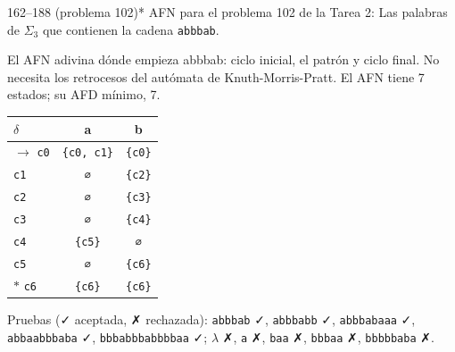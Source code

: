 \documentclass[11pt]{article}
\begin{document}
\begin{ejercicio}{162--188 (problema 102)}{*}
AFN para el problema 102 de la Tarea 2: Las palabras de $\Sigma_3$ que contienen la cadena \texttt{abbbab}.
\end{ejercicio}
\proc El AFN adivina dónde empieza abbbab: ciclo inicial, el patrón y ciclo final. No necesita los retrocesos del autómata de Knuth-Morris-Pratt. El AFN tiene 7 estados; su AFD mínimo, 7.
\begin{center}\small\begin{tabular}{lcc}\toprule
$\delta$ & a & b \\\midrule
$\to$ \texttt{c0} & \texttt{\{c0, c1\}} & \texttt{\{c0\}} \\
 \texttt{c1} & \texttt{∅} & \texttt{\{c2\}} \\
 \texttt{c2} & \texttt{∅} & \texttt{\{c3\}} \\
 \texttt{c3} & \texttt{∅} & \texttt{\{c4\}} \\
 \texttt{c4} & \texttt{\{c5\}} & \texttt{∅} \\
 \texttt{c5} & \texttt{∅} & \texttt{\{c6\}} \\
$*$ \texttt{c6} & \texttt{\{c6\}} & \texttt{\{c6\}} \\
\bottomrule\end{tabular}\end{center}
Pruebas (✓ aceptada, ✗ rechazada): \texttt{abbbab} ✓, \texttt{abbbabb} ✓, \texttt{abbbabaaa} ✓, \texttt{abbaabbbaba} ✓, \texttt{bbbabbbabbbbaa} ✓; $\lambda$ ✗, \texttt{a} ✗, \texttt{baa} ✗, \texttt{bbbaa} ✗, \texttt{bbbbbaba} ✗.
\end{document}
